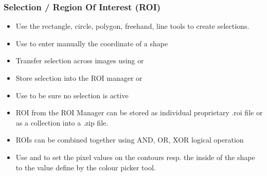 \documentclass[ignorenonframetext,aspectratio=169,10pt,xcolor=table]{beamer}
\begin{document}
\begin{frame}
\end{frame}


\begin{frame} \frametitle{Selection / Region Of Interest (ROI)}

  \begin{itemize} \setlength\itemsep{1em}
    \item Use the rectangle, circle, polygon, freehand, line tools to
      create selections.
    \item Use  to enter manually the
      coordinate of a shape
    \item Transfer selection across images using
       or 
    \item Store selection into the ROI manager  or 
    \item Use   to
      be sure no selection is active
    \item ROI from the ROI Manager can be stored as individual
      proprietary .roi file or as a collection into a .zip file.
    \item ROIs can be combined together using AND, OR, XOR logical
      operation
    \item Use  and  to set the pixel
      values on the contours resp. the inside of the shape to the value
      define by the colour picker tool.
  \end{itemize}

\end{frame}
\end{document}
